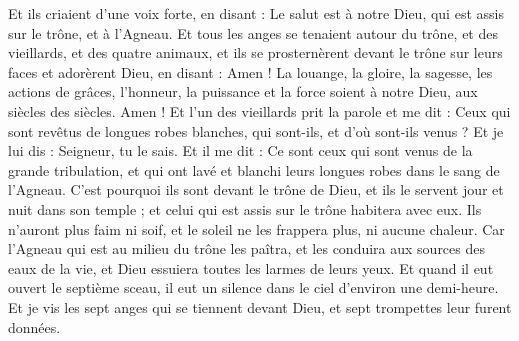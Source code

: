\begin{multicols}{2}
Et ils criaient d’une voix forte, en disant : Le salut est à notre Dieu, qui est assis sur le trône, et à l'Agneau.
Et tous les anges se tenaient autour du trône, et des vieillards, et des quatre animaux, et ils se prosternèrent devant le trône sur leurs faces et adorèrent Dieu,
en disant : Amen ! La louange, la gloire, la sagesse, les actions de grâces, l’honneur, la puissance et la force soient à notre Dieu, aux siècles des siècles. Amen !
Et l’un des vieillards prit la parole et me dit : Ceux qui sont revêtus de longues robes blanches, qui sont-ils, et d'où sont-ils venus ?
Et je lui dis : Seigneur, tu le sais. Et il me dit : Ce sont ceux qui sont venus de la grande tribulation{}, et qui ont lavé et blanchi leurs longues robes dans le sang de l'Agneau.
C'est pourquoi ils sont devant le trône de Dieu, et ils le servent jour et nuit dans son temple ; et celui qui est assis sur le trône habitera avec eux.
Ils n'auront plus faim ni soif, et le soleil ne les frappera plus, ni aucune chaleur.
Car l'Agneau qui est au milieu du trône les paîtra, et les conduira aux sources des eaux de la vie, et Dieu essuiera toutes les larmes de leurs yeux.
\VerseOne{}Et quand il eut ouvert le septième sceau, il eut un silence dans le ciel d'environ une demi-heure.
Et je vis les sept anges qui se tiennent devant Dieu, et sept trompettes leur furent données.

\end{multicols}
